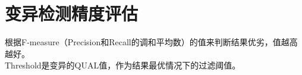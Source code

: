 \documentclass[UTF8,10pt,a4paper]{ctexart}
\begin{document}

\newpage
\section{变异检测精度评估}
根据F-measure（Precision和Recall的调和平均数）的值来判断结果优劣，值越高越好。\\
Threshold是变异的QUAL值，作为结果最优情况下的过滤阈值。
\end{document}
